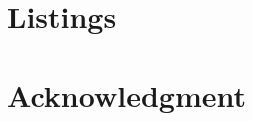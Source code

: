 \documentclass[
    a4paper,
    11pt,
    DIV=calc,
    numbers=noenddot,
    bibliography=totoc,
    listof=leveldown,
    headinclude,
    titlepage=firstiscover,
    listof=leveldown,
]{scrbook}
\begin{document}
\frontmatter







\tableofcontents
\clearpage


%

\mainmatter
\renewcommand{\thechapter}{\Roman{chapter}}


\newpage







\appendix


\cleardoublepage
{}
\printbibliography

\backmatter


\chapter*{Listings}
\listoffigures
\listoftables

\chapter*{Acknowledgment}
%

%
\end{document}
